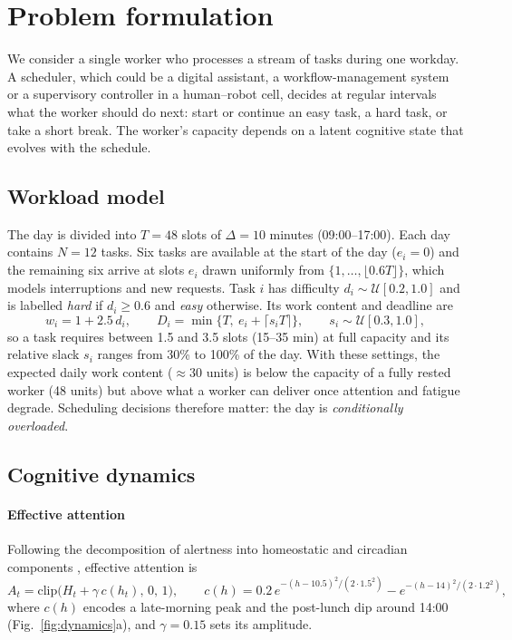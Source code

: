 \section{Problem formulation}\label{sec:problem}

We consider a single worker who processes a stream of tasks during one workday. A scheduler, which could be a digital assistant, a workflow-management system or a supervisory controller in a human--robot cell, decides at regular intervals what the worker should do next: start or continue an easy task, a hard task, or take a short break. The worker's capacity depends on a latent cognitive state that evolves with the schedule. 

\subsection{Workload model}
The day is divided into $T=48$ slots of $\Delta=10$ minutes (09:00--17:00). Each day contains $N=12$ tasks. Six tasks are available at the start of the day ($e_i=0$) and the remaining six arrive at slots $e_i$ drawn uniformly from $\{1,\dots,\lfloor0.6T\rfloor\}$, which models interruptions and new requests. Task $i$ has difficulty $d_i\sim\mathcal U[0.2,1.0]$ and is labelled \emph{hard} if $d_i\ge0.6$ and \emph{easy} otherwise. Its work content and deadline are
\begin{equation}
w_i=1+2.5\,d_i,\qquad D_i=\min\{T,\ e_i+\lceil s_iT\rceil\},\qquad s_i\sim\mathcal U[0.3,1.0],
\label{eq:task}
\end{equation}
so a task requires between 1.5 and 3.5 slots (15--35 min) at full capacity and its relative slack $s_i$ ranges from 30\% to 100\% of the day. With these settings, the expected daily work content ($\approx\!30$ units) is below the capacity of a fully rested worker (48 units) but above what a worker can deliver once attention and fatigue degrade. Scheduling decisions therefore matter: the day is \emph{conditionally overloaded}.

\subsection{Cognitive dynamics}
\paragraph{Effective attention}
Following the decomposition of alertness into homeostatic and circadian components \cite{borbely1982,akerstedt1997,borbely2016}, effective attention is
\begin{equation}
A_t=\mathrm{clip}\big(H_t+\gamma\,c(h_t),\,0,\,1\big),\qquad
c(h)=0.2\,e^{-(h-10.5)^2/(2\cdot1.5^2)}-e^{-(h-14)^2/(2\cdot1.2^2)},
\label{eq:attention}
\end{equation}
where $c(h)$ encodes a late-morning peak and the post-lunch dip around 14:00 \cite{monk2005,schmidt2007,blatter2007} (Fig.~\ref{fig:dynamics}a), and $\gamma=0.15$ sets its amplitude.

